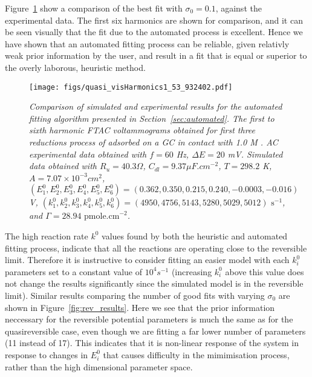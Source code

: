 \documentclass[a4paper, 12pt]{article}
\begin{document}
Figure~\ref{fig:quasi_best_result} show a comparison of the best fit with
$\sigma_0=0.1$, against the experimental data. The first six harmonics are shown
for comparison, and it can be seen visually that the fit due to the automated
process is excellent. Hence we have shown that an automated fitting process can
be reliable, given relativly weak prior information by the user, and result in a
fit that is equal or superior to the overly laborous, heuristic method.

\begin{figure}[htbp]
\texttt{[image: figs/quasi\_visHarmonics1\_53\_932402.pdf]}
    \caption{\it{Comparison of simulated and experimental results for the
    automated fitting algorithm presented in Section~\ref{sec:automated}. The
    first to sixth harmonic FTAC voltammograms obtained for first three
    reductions process of  adsorbed on a GC in contact with 1.0
    M . AC experimental data obtained with $f = 60$ Hz, $\Delta E =
    20$ mV. Simulated data obtained with $R_u = 40.3 \Omega$, $C_{dl} = 9.37 \mu
    F.cm^{-2}$, $T = 298.2$ K, $A = 7.07 \times 10^{-3} cm^2$,
    $(E^0_1,E^0_2,E^0_3,E^0_4,E^0_5,E^0_6) = (0.362, 0.350, 0.215, 0.240, -0.0003,
    -0.016)$ V, $(k^0_1,k^0_2,k^0_3,k^0_4,k^0_5,k^0_6) = (4950, 4756, 5143, 5280,
    5029, 5012)\text{ s}^{-1}$, and $\Gamma =28.94\text{ pmole.cm}^{-2}$.}}
    \label{fig:quasi_best_result}
\end{figure}

The high reaction rate $k^0$ values found by both the heuristic and automated
fitting process, indicate that all the reactions are operating close to the
reversible limit. Therefore it is instructive to consider fitting an easier
model with each $k^0_i$ parameters set to a constant value of $10^4 s^{-1}$
(increasing $k^0_i$ above this value does not change the results significantly
since the simulated model is in the reversible limit). Similar results comparing
the number of good fits with varying $\sigma_0$ are shown in
Figure~\ref{fig:rev_results}. Here we see that the prior information neccessary
for the reversible potential parameters is much the same as for the
quasireversible case, even though we are fitting a far lower number of
parameters (11 instead of 17). This indicates that it is non-linear response of
the system in response to changes in $E^0_i$ that causes difficulty in the
mimimisation process, rather than the high dimensional parameter space.
\end{document}

